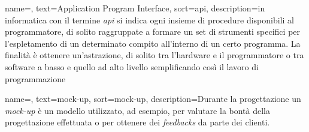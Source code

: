
\renewcommand{\acronymname}{Acronimi e abbreviazioni}






{
    name=,
    text=Application Program Interface,
    sort=api,
    description={in informatica con il termine \emph{\acrfull{api}} si indica ogni insieme di procedure disponibili al programmatore, di solito raggruppate a formare un set di strumenti specifici per l'espletamento di un determinato compito all'interno di un certo programma. La finalità è ottenere un'astrazione, di solito tra l'hardware e il programmatore o tra software a basso e quello ad alto livello semplificando così il lavoro di programmazione}
}


{
    name=,
    text=mock-up,
    sort=mock-up,
    description={Durante la progettazione un \emph{mock-up} è un modello utilizzato, ad esempio, per valutare la bontà della progettazione effettuata o per ottenere dei \emph{feedbacks} da parte dei clienti.}
}

